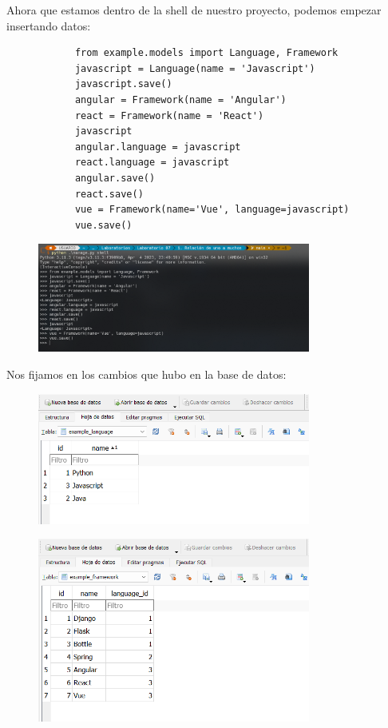 \documentclass{article}
\begin{document}
\begin{enumerate}
		Ahora que estamos dentro de la shell de nuestro proyecto, podemos empezar insertando datos:
		\begin{lstlisting}
			from example.models import Language, Framework
			javascript = Language(name = 'Javascript')
			javascript.save()
			angular = Framework(name = 'Angular')
			react = Framework(name = 'React')
			javascript
			angular.language = javascript
			react.language = javascript
			angular.save()
			react.save()
			vue = Framework(name='Vue', language=javascript)
			vue.save()
		\end{lstlisting}
		\begin{figure}[H]
			\centering
			\includegraphics[width=0.8\textwidth,keepaspectratio]{img/Ejercicio1/insert.png}
		\end{figure}
		Nos fijamos en los cambios que hubo en la base de datos:
		\begin{figure}[H]
			\centering
			\includegraphics[width=0.8\textwidth,keepaspectratio]{img/Ejercicio1/bd-language.png}
		\end{figure}
		\begin{figure}[H]
			\centering
			\includegraphics[width=0.8\textwidth,keepaspectratio]{img/Ejercicio1/bd-framework.png}

\end{figure}
\end{enumerate}
\end{document}
